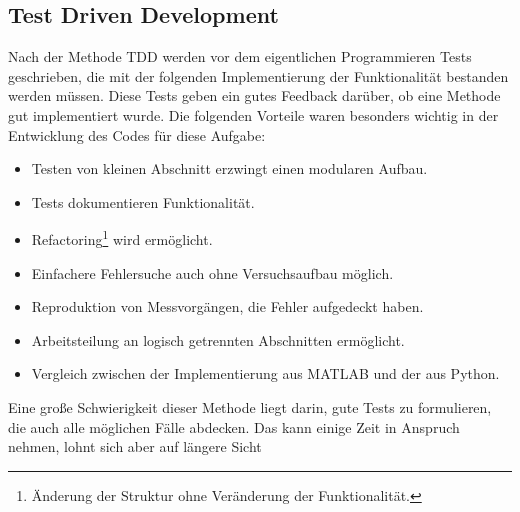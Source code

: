 \documentclass[../Report.tex]{subfiles}
\begin{document}
\subsection{Test Driven Development}
\label{subsec:code.tdd}
Nach der Methode TDD werden vor dem eigentlichen Programmieren Tests geschrieben, die mit der folgenden Implementierung der Funktionalität bestanden werden müssen. Diese Tests geben ein gutes Feedback darüber, ob eine Methode gut implementiert wurde. Die folgenden Vorteile waren besonders wichtig in der Entwicklung des Codes für diese Aufgabe:
\begin{itemize}
	\item Testen von kleinen Abschnitt erzwingt einen modularen Aufbau.
	\item Tests dokumentieren Funktionalität.
	\item Refactoring\footnote{Änderung der Struktur ohne Veränderung der Funktionalität.} wird ermöglicht.
	\item Einfachere Fehlersuche auch ohne Versuchsaufbau möglich.
	\item Reproduktion von Messvorgängen, die Fehler aufgedeckt haben.
	\item Arbeitsteilung an logisch getrennten Abschnitten ermöglicht.
	\item Vergleich zwischen der Implementierung aus MATLAB und der aus Python.
\end{itemize}
Eine große Schwierigkeit dieser Methode liegt darin, gute Tests zu formulieren, die auch alle möglichen Fälle abdecken. Das kann einige Zeit in Anspruch nehmen, lohnt sich aber auf längere Sicht
\end{document}
